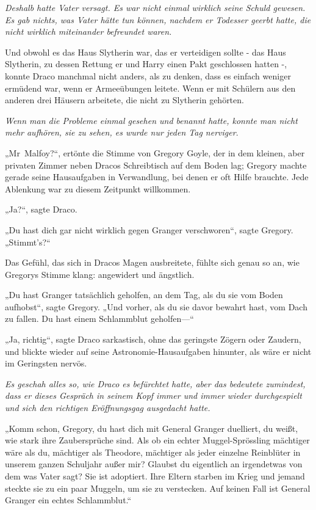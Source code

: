 {\emph{Deshalb hatte Vater versagt. Es war nicht einmal wirklich seine Schuld gewesen. Es gab nichts, was Vater hätte tun können, nachdem er Todesser geerbt hatte, die nicht wirklich miteinander befreundet waren.}

Und obwohl es das Haus Slytherin war, das er verteidigen sollte - das Haus Slytherin, zu dessen Rettung er und Harry einen Pakt geschlossen hatten -, konnte Draco manchmal nicht anders, als zu denken, dass es einfach weniger ermüdend war, wenn er Armeeübungen leitete. Wenn er mit Schülern aus den anderen drei Häusern arbeitete, die nicht zu Slytherin gehörten.

\emph{Wenn man die Probleme einmal gesehen und benannt hatte, konnte man nicht mehr aufhören, sie zu sehen, es wurde nur jeden Tag nerviger}.

„Mr~Malfoy?“, ertönte die Stimme von Gregory Goyle, der in dem kleinen, aber privaten Zimmer neben Dracos Schreibtisch auf dem Boden lag; Gregory machte gerade seine Hausaufgaben in Verwandlung, bei denen er oft Hilfe brauchte. Jede Ablenkung war zu diesem Zeitpunkt willkommen.

„Ja?“, sagte Draco.

„Du hast dich gar nicht wirklich gegen Granger verschworen“, sagte Gregory. „Stimmt's?“

Das Gefühl, das sich in Dracos Magen ausbreitete, fühlte sich genau so an, wie Gregorys Stimme klang: angewidert und ängstlich.

„Du hast Granger tatsächlich geholfen, an dem Tag, als du sie vom Boden aufhobst“, sagte Gregory. „Und vorher, als du sie davor bewahrt hast, vom Dach zu fallen. Du hast einem Schlammblut geholfen—“

„Ja, richtig“, sagte Draco sarkastisch, ohne das geringste Zögern oder Zaudern, und blickte wieder auf seine Astronomie-Hausaufgaben hinunter, als wäre er nicht im Geringsten nervös.

\emph{Es geschah alles so, wie Draco es befürchtet hatte, aber das bedeutete zumindest, dass er dieses Gespräch in seinem Kopf immer und immer wieder durchgespielt und sich den richtigen Eröffnungsgag ausgedacht hatte.}

„Komm schon, Gregory, du hast dich mit General Granger duelliert, du weißt, wie stark ihre Zaubersprüche sind. Als ob ein echter Muggel-Sprössling mächtiger wäre als du, mächtiger als Theodore, mächtiger als jeder einzelne Reinblüter in unserem ganzen Schuljahr außer mir? Glaubst du eigentlich an irgendetwas von dem was Vater sagt? Sie ist adoptiert. Ihre Eltern starben im Krieg und jemand steckte sie zu ein paar Muggeln, um sie zu verstecken. Auf keinen Fall ist General Granger ein echtes Schlammblut.“

}
